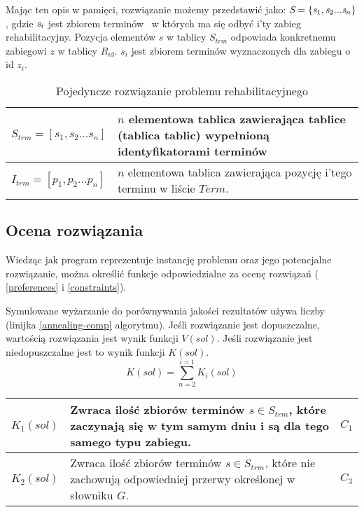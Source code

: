Mając ten opis w pamięci, rozwiązanie możemy przedstawić jako:
$\emph{S}=\{\emph{s}_1,\emph{s}_2...\emph{s}_n\}$, gdzie $\emph{s}_i$ jest
zbiorem terminów \sTerm\ w których ma się odbyć i'ty zabieg rehabilitacyjny.
Pozycja elementów $s$ w tablicy $S_{trm}$ odpowiada konkretnemu zabiegowi $z$ w
tablicy $R_{id}$. $s_i$ jest zbiorem terminów wyznaczonych dla zabiegu o id
$z_i$.
\begin{table}[h]
	\begin{tabular}{ | m{} | m{} | }
		\hline
		$S_{trm}=[s_1,s_2...s_n]$ & $n$ elementowa tablica zawierająca tablice
		(tablica tablic) wypełnioną identyfikatorami terminów \\
		\hline
		$I_{trm}=[p_1,p_2...p_n]$ & $n$ elementowa tablica zawierająca pozycję i'tego terminu w liście $Term$.\\
		\hline
\end{tabular}
\caption{Pojedyncze rozwiązanie problemu rehabilitacyjnego}
\end{table}
\newpage
\subsection{Ocena rozwiązania}
Wiedząc jak program reprezentuje instancję problemu oraz jego potencjalne
rozwiązanie, można określić funkcje odpowiedzialne za ocenę rozwiązań
( \ref{preferences} i  \ref{constraints}).

Symulowane wyżarzanie do porównywania jakości rezultatów używa liczby (linijka
\ref{annealing-comp} algorytmu). Jeśli rozwiązanie jest dopuszczalne, wartością
rozwiązania jest wynik funkcji $V(sol)$. Jeśli rozwiązanie jest niedopuszczalne
jest to wynik funkcji $K(sol)$.
\begin{equation}
	K(sol) = \sum_{n=2}^{i=1} K_i(sol)
\end{equation}

\begin{table}[h]
\begin{tabularx}{\textwidth}{ | C{0.4} | L{2.3} | C{0.3} | }		
	\hline
		$K_1(sol)$ & Zwraca ilość zbiorów terminów $s \in S_{trm}$, które zaczynają się w tym
		samym dniu i są dla tego samego typu zabiegu. & $C_1$ \\
		\hline
		$K_2(sol)$ & Zwraca ilość zbiorów terminów $s \in S_{trm}$,
		które nie zachowują odpowiedniej przerwy określonej w słowniku
		$G$. & $C_3$ \\
		\hline
\end{tabularx}
\end{table}


